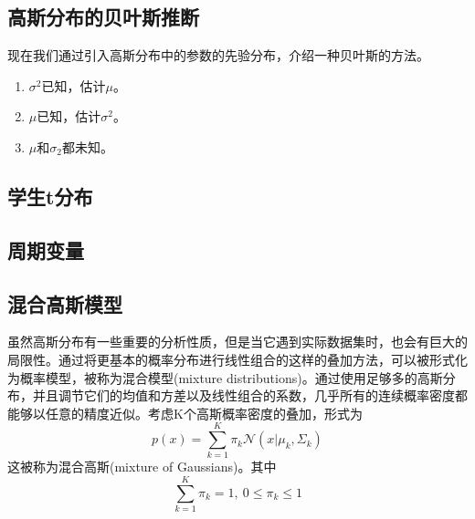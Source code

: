\subsection*{高斯分布的贝叶斯推断}
现在我们通过引入高斯分布中的参数的先验分布，介绍一种贝叶斯的方法。
\begin{enumerate}
	\item $\sigma^2$已知，估计$\mu$。
	\item $\mu$已知，估计$\sigma^2$。
	\item $\mu$和$\sigma_{2}$都未知。
\end{enumerate}
\subsection*{学生t分布}
\subsection*{周期变量}
\subsection*{混合高斯模型}
虽然高斯分布有一些重要的分析性质，但是当它遇到实际数据集时，也会有巨大的局限性。通过将更基本的概率分布进行线性组合的这样的叠加方法，可以被形式化为概率模型，被称为混合模型(mixture distributions)。通过使用足够多的高斯分布，并且调节它们的均值和方差以及线性组合的系数，几乎所有的连续概率密度都能够以任意的精度近似。考虑K个高斯概率密度的叠加，形式为
\begin{equation}
	p(x)=\sum_{k=1}^{K}\pi_k\mathcal{N}(x|\mu_k,\Sigma_k)
\end{equation}
这被称为混合高斯(mixture of Gaussians)。其中
\begin{equation}
	\sum_{k=1}^{K}\pi_k=1,\ 0\leqslant \pi_k \leqslant 1
\end{equation}